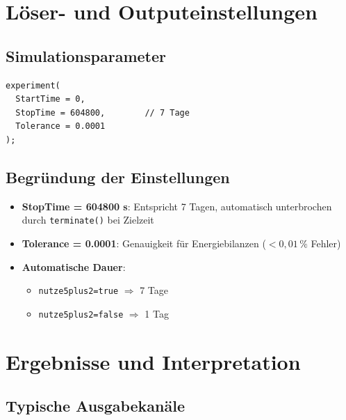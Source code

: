 \documentclass[conference]{IEEEtran}
\begin{document}
\section{Löser- und Outputeinstellungen}

\subsection{Simulationsparameter}

\begin{verbatim}
experiment(
  StartTime = 0,
  StopTime = 604800,        // 7 Tage
  Tolerance = 0.0001
);
\end{verbatim}

\subsection{Begründung der Einstellungen}

\begin{itemize}
\item \textbf{StopTime = 604800 s}: Entspricht 7 Tagen, automatisch unterbrochen durch \texttt{terminate()} bei Zielzeit
\item \textbf{Tolerance = 0.0001}: Genauigkeit für Energiebilanzen ($< 0,01\,\%$ Fehler)
\item \textbf{Automatische Dauer}: 
  \begin{itemize}
  \item \texttt{nutze5plus2=true} $\Rightarrow$ 7 Tage
  \item \texttt{nutze5plus2=false} $\Rightarrow$ 1 Tag
  \end{itemize}
\end{itemize}

\section{Ergebnisse und Interpretation}

\subsection{Typische Ausgabekanäle}
\end{document}
